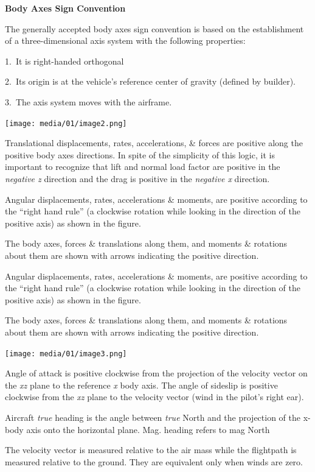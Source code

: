\documentclass[
]{book}
\begin{document}
\textbf{Body Axes Sign Convention}

The generally accepted body axes sign convention is based on the establishment of a three-dimensional axis system with the following properties:

1.~It is right-handed orthogonal

2.~Its origin is at the vehicle's reference center of gravity (defined by builder).

3.~The axis system moves with the airframe.

\texttt{[image: media/01/image2.png]}

Translational displacements, rates, accelerations, \& forces are positive along the positive body axes directions. In spite of the simplicity of this logic, it is important to recognize that lift and normal load factor are positive in the \emph{negative z} direction and the drag is positive in the \emph{negative x} direction.

Angular displacements, rates, accelerations \& moments, are positive according to the ``right hand rule'' (a clockwise rotation while looking in the direction of the positive axis) as shown in the figure.

The body axes, forces \& translations along them, and moments \& rotations about them are shown with arrows indicating the positive direction.

Angular displacements, rates, accelerations \& moments, are positive according to the ``right hand rule'' (a clockwise rotation while looking in the direction of the positive axis) as shown in the figure.

The body axes, forces \& translations along them, and moments \& rotations about them are shown with arrows indicating the positive direction.

\texttt{[image: media/01/image3.png]}

Angle of attack is positive clockwise from the projection of the velocity vector on the \emph{xz} plane to the reference \emph{x} body axis. The angle of sideslip is positive clockwise from the \emph{xz} plane to the velocity vector (wind in the pilot's right ear).

Aircraft \emph{true} heading is the angle between \emph{true} North and the projection of the x-body axis onto the horizontal plane. Mag. heading refers to mag North

The velocity vector is measured relative to the air mass while the flightpath is measured relative to the ground. They are equivalent only when winds are zero.
\end{document}
